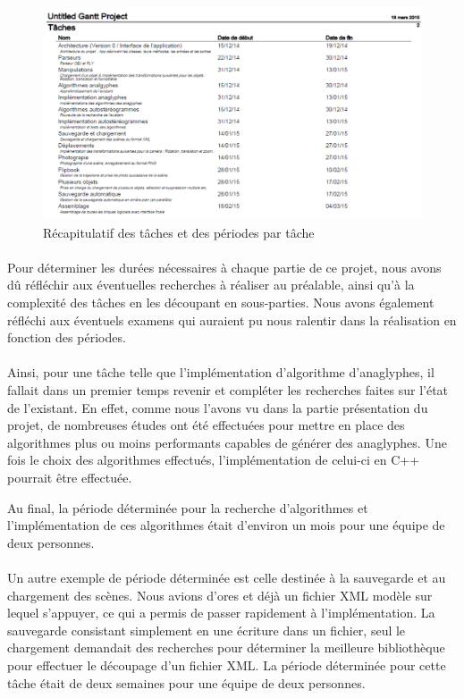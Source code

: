 \begin{figure}[h]
	\centering
	\includegraphics[scale=0.8]{gantp.png}
	\caption{\label{fig:gantP} Récapitulatif des tâches et des périodes par tâche \protect \footnotemark }
\end{figure}

\paragraph{}
Pour déterminer les durées nécessaires à chaque partie de ce projet, nous avons dû réfléchir aux éventuelles recherches à réaliser au préalable, ainsi qu'à la complexité des tâches en les découpant en sous-parties. Nous avons également réfléchi aux éventuels examens qui auraient pu nous ralentir dans la réalisation en fonction des périodes.

\paragraph{}
Ainsi, pour une tâche telle que l'implémentation d'algorithme d'anaglyphes, il fallait dans un premier temps revenir et compléter les recherches faites sur l'état de l'existant. En effet, comme nous l'avons vu dans la partie présentation du projet, de nombreuses études ont été effectuées pour mettre en place des algorithmes plus ou moins performants capables de générer des anaglyphes. Une fois le choix des algorithmes effectués, l'implémentation de celui-ci en C++ pourrait être effectuée.

Au final, la période déterminée pour la recherche d'algorithmes et l'implémentation de ces algorithmes était d'environ un mois pour une équipe de deux personnes.

\paragraph{}
Un autre exemple de période déterminée est celle destinée à la sauvegarde et au chargement des scènes. Nous avions d'ores et déjà un fichier XML modèle sur lequel s'appuyer, ce qui a permis de passer rapidement à l'implémentation. La sauvegarde consistant simplement en une écriture dans un fichier, seul le chargement demandait des recherches pour déterminer la meilleure bibliothèque pour effectuer le découpage d'un fichier XML. La période déterminée pour cette tâche était de deux semaines pour une équipe de deux personnes.
